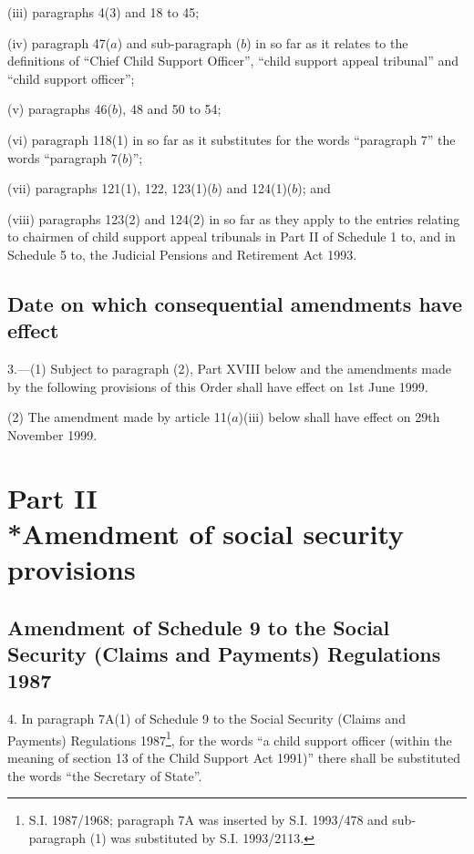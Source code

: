 \documentclass[12pt,a4paper]{article}
\begin{document}
\begin{enumerate}
\begin{enumerate}
(iii) paragraphs 4(3) and 18 to 45;

(iv) paragraph 47($a$) and sub-paragraph ($b$) in so far as it relates to the definitions of “Chief Child Support Officer”, “child support appeal tribunal” and “child support officer”;

(v) paragraphs 46($b$), 48 and 50 to 54;

(vi) paragraph 118(1) in so far as it substitutes for the words “paragraph 7” the words “paragraph 7($b$)”;

(vii) paragraphs 121(1), 122, 123(1)($b$) and 124(1)($b$); and

(viii) paragraphs 123(2) and 124(2) in so far as they apply to the entries relating to chairmen of child support appeal tribunals in Part II of Schedule 1 to, and in Schedule 5 to, the Judicial Pensions and Retirement Act 1993.
\end{enumerate}
\end{enumerate}

\subsection[3. Date on which consequential amendments have effect]{Date on which consequential amendments have effect}

3.—(1) Subject to paragraph (2), Part XVIII below and the amendments made by the following provisions of this Order shall have effect on 1st June 1999.

(2) The amendment made by article 11($a$)(iii) below shall have effect on 29th November 1999.

\section[Part II --- Amendment of social security provisions]{Part II\\*Amendment of social security provisions}

\renewcommand\parthead{--- Part II}

\subsection[4. Amendment of Schedule 9 to the Social Security (Claims and Payments) Regulations 1987]{Amendment of Schedule 9 to the Social Security (Claims and Payments) Regulations 1987}

4.  In paragraph 7A(1) of Schedule 9 to the Social Security (Claims and Payments) Regulations 1987\footnote{\frenchspacing S.I. 1987/1968; paragraph 7A was inserted by S.I. 1993/478 and sub-paragraph (1) was substituted by S.I. 1993/2113.}, for the words “a child support officer (within the meaning of section 13 of the Child Support Act 1991)” there shall be substituted the words “the Secretary of State”.
\end{document}
